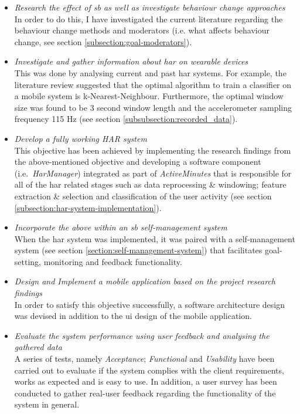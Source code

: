 \begin{itemize}
    \item \textit{Research the effect of \gls{sb} as well as investigate behaviour change approaches}\\
    In order to do this, I have investigated the current literature regarding the behaviour change methods and moderators (i.e. what affects behaviour change, see section \ref{subsection:goal-moderators}).
    \item \textit{Investigate and gather information about \gls{har} on wearable devices}\\
    This was done by analysing current and past \gls{har} systems. For example, the literature review suggested that the optimal algorithm to train a classifier on a mobile system is k-Nearest-Neighbour. Furthermore, the optimal window size was found to be 3 second window length and the accelerometer sampling frequency 115 Hz (see section \ref{subsubsection:recorded_data}).
    \item \textit{Develop a fully working HAR system}\\
    This objective has been achieved by implementing the research findings from the above-mentioned objective and developing a software component (i.e.\ \textit{HarManager}) integrated as part of \textit{ActiveMinutes} that is responsible for all of the \gls{har} related stages such as data reprocessing \& windowing; feature extraction \& selection and classification of the user activity (see section \ref{subsection:har-system-implementation}).
    
    \item \textit{Incorporate the above within an \gls{sb} self-management system}\\
    When the \gls{har} system was implemented, it was paired with a self-management system (see section \ref{section:self-management-system}) that facilitates goal-setting, monitoring and feedback functionality.
    \item \textit{Design and Implement a mobile application based on the project research findings}\\
    In order to satisfy this objective successfully, a software architecture design was devised in addition to the \gls{ui} design of the mobile application.
    
    \item \textit{Evaluate the system performance using user feedback and analysing the gathered data}\\
    A series of tests, namely \textit{Acceptance}; \textit{Functional} and \textit{Usability} have been carried out to evaluate if the system complies with the client requirements, works as expected and is easy to use. In addition, a user survey has been conducted to gather real-user feedback regarding the functionality of the system in general.
    

\end{itemize}
